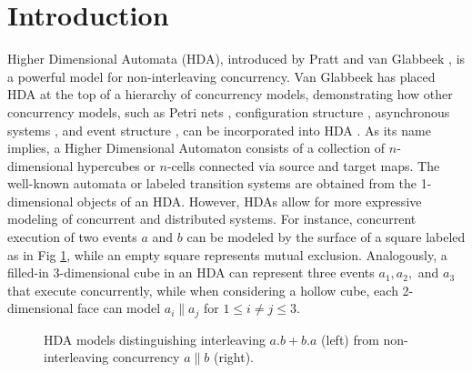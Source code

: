 \documentclass[11pt,a4paper,oldfontcommands]{memoir}
\newcommand*\para{\mathrel{\|}}
\begin{document}
\section{Introduction}
Higher Dimensional Automata (HDA), introduced by Pratt \cite{PrattCG} and van Glabbeek \cite{VANGLABBEEK2006265}, is a powerful model for non-interleaving concurrency. Van Glabbeek has placed HDA at the top of a hierarchy of concurrency models, demonstrating how other concurrency models, such as Petri nets \cite{nielsen1981petri}, configuration structure \cite{van1995configuration}, asynchronous systems \cite{bednarczyk1989categories,shields1985concurrent}, and event structure \cite{winskel1986event,winskel1989introduction}, can be incorporated into HDA \cite{VANGLABBEEK2006265}. As its name implies, a Higher Dimensional Automaton consists of a collection of $n$-dimensional hypercubes or $n$-cells connected via source and target maps. The well-known automata or labeled transition systems are obtained from the 1-dimensional objects of an HDA. However, HDAs allow for more expressive modeling of concurrent and distributed systems.
For instance, concurrent execution of two events $a$ and $b$ can be modeled by the surface of a square labeled as in Fig \ref{fi:int-conc}, while an empty square represents mutual exclusion. Analogously, a filled-in 3-dimensional cube in an HDA can represent three events $a_1,a_2,$ and $a_3$ that execute concurrently, while when considering a hollow cube, each 2-dimensional face can model $a_i \parallel a_j$ for $1 \leq i\neq j \leq 3$. 
 \begin{figure}
    \centering
    \bigskip
     \caption{HDA models distinguishing interleaving $a. b+ b. a$ (left) from non-interleaving concurrency $a\para b$ (right).}
  \label{fi:int-conc}
  \end{figure}
\end{document}
